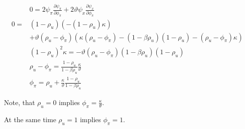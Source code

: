 {\begin{enumerate}[label=(\alph*)]
{$$
\begin{aligned}
& 0 = 2 \psi_{\pi} \frac{\partial \psi_{\pi}}{\partial \phi_{\pi}}+2 \vartheta \psi_{x} \frac{\partial \psi_{x}}{\partial \phi_{\pi}} \\
0=&\left(1-\rho_{u}\right)\left(-\left(1-\rho_{u}\right) \kappa \right) \\
& +\vartheta\left(\rho_{u}-\phi_{\pi}\right)\left(\kappa\left(\rho_{u}-\phi_{\pi}\right)-\left(1-\beta\rho_{ u}\right)\left(1-\rho_{u}\right)-\left(\rho_{u}-\phi_{\pi}\right) \kappa\right) \\
& \left(1-\rho_{u}\right)^{2} \kappa=-\vartheta\left(\rho_{u}-\phi_{\pi}\right)\left(1-\beta\rho_{u}\right)\left(1-\rho_{u}\right) \\
& \rho_{u}-\phi_{\pi}=\frac{1-\rho_{u}}{1-\beta\rho_{u}} \frac{\kappa}{\vartheta} \\
& \phi_{\pi}=\rho_{u}+\frac{\kappa}{\vartheta} \frac{1-\rho_{u}}{1-\beta\rho_{u}}
\end{aligned}
$$

Note, that $\rho_{u}=0$ implies $\phi_{\pi}=\frac{\kappa}{\theta}$. 

At the same time $\rho_{u}=1$ implies $\phi_\pi=1$.
}
\end{enumerate}
}
